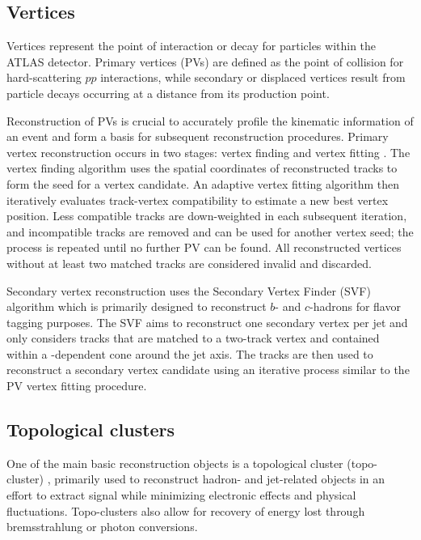 \documentclass[../thesis.tex]{subfiles}
\begin{document}
\subsection{Vertices}

Vertices represent the point of interaction or decay for particles within the ATLAS detector. Primary vertices (\acs{PV}s) are defined as the point of collision for hard-scattering $pp$ interactions, while secondary or displaced vertices result from particle decays occurring at a distance from its production point. 

Reconstruction of \acs{PV}s is crucial to accurately profile the kinematic information of an event and form a basis for subsequent reconstruction procedures. Primary vertex reconstruction occurs in two stages: vertex finding and vertex fitting \citep{reco:vertex_primary}. The vertex finding algorithm uses the spatial coordinates of reconstructed tracks to form the seed for a vertex candidate. An adaptive vertex fitting algorithm \citep{reco:vertex_fitting} then iteratively evaluates track-vertex compatibility to estimate a new best vertex position. Less compatible tracks are down-weighted in each subsequent iteration, and incompatible tracks are removed and can be used for another vertex seed; the process is repeated until no further \acs{PV} can be found. All reconstructed vertices without at least two matched tracks are considered invalid and discarded.

Secondary vertex reconstruction uses the Secondary Vertex Finder (SVF) algorithm \citep{reco:vertex_secondary} which is primarily designed to reconstruct $b$- and $c$-hadrons for flavor tagging purposes. The SVF aims to reconstruct one secondary vertex per jet and only considers tracks that are matched to a two-track vertex and contained within a \pT-dependent cone around the jet axis. The tracks are then used to reconstruct a secondary vertex candidate using an iterative process similar to the \acs{PV} vertex fitting procedure.

\subsection{Topological clusters}
\label{sec:topocluster}

One of the main basic reconstruction objects is a topological cluster (topo-cluster) \citep{reco:topocluster}, primarily used to reconstruct hadron- and jet-related objects in an effort to extract signal while minimizing electronic effects and physical fluctuations. Topo-clusters also allow for recovery of energy lost through bremsstrahlung or photon conversions.
\end{document}
